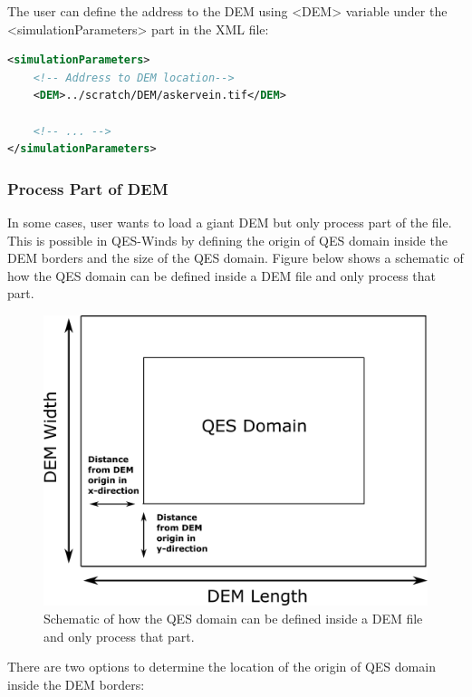 The user can define the address to the DEM using <DEM> variable under the <simulationParameters> part in the XML file:

\begin{lstlisting}[language=XML]
<simulationParameters>
	<!-- Address to DEM location-->
	<DEM>../scratch/DEM/askervein.tif</DEM>
	
	<!-- ... -->
</simulationParameters>
\end{lstlisting}

\subsubsection{Process Part of DEM}

In some cases, user wants to load a giant DEM but only process part of the file. This is possible in QES-Winds by defining the origin of QES domain inside the DEM borders and the size of the QES domain. Figure below shows a schematic of how the QES domain can be defined inside a DEM file and only process that part.

\begin{figure}[h!]
\centering
\includegraphics[width=13.0cm,keepaspectratio]{Images/DEM_cut.png}
\caption{Schematic of how the QES domain can be defined inside a DEM file and only process that part. }
\end{figure}

There are two options to determine the location of the origin of QES domain inside the DEM borders:

